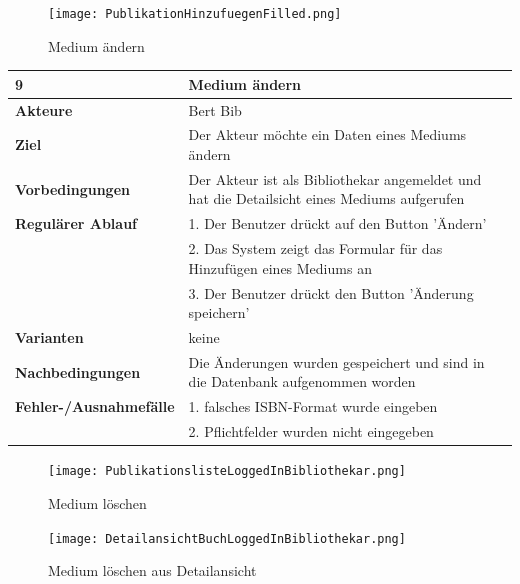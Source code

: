 \documentclass[fontsize=12pt,paper=a4,twoside]{scrartcl}
\begin{document}
\begin{figure}
	[H] \caption{Medium ändern} 
	\texttt{[image: PublikationHinzufuegenFilled.png]} \label{pic:MedAendern} 
\end{figure}
\begin{table}
	[H] \label{9} 
	\begin{tabular}
		{|l|p{10cm}|} \hline \textbf{9} & \textbf{Medium ändern} \\
		\hline \textbf{Akteure} & Bert Bib\\
		\hline \textbf{Ziel} & Der Akteur möchte ein Daten eines Mediums ändern \\
		\hline \textbf{Vorbedingungen} & Der Akteur ist als Bibliothekar angemeldet und hat die Detailsicht eines Mediums aufgerufen \\
		\hline \textbf{Regulärer Ablauf} & 1. Der Benutzer drückt auf den Button 'Ändern' \\
		&2. Das System zeigt das Formular für das Hinzufügen eines Mediums an\\
		&3. Der Benutzer drückt den Button 'Änderung speichern'\\
		\hline \textbf{Varianten} & keine \\
		\hline \textbf{Nachbedingungen} & Die Änderungen wurden gespeichert und sind in die Datenbank aufgenommen worden\\
		\hline \textbf{Fehler-/Ausnahmefälle} & 1. falsches ISBN-Format wurde eingeben\\
		&2. Pflichtfelder wurden nicht eingegeben\\
		\hline 
	\end{tabular}
\end{table}
\begin{figure}
	[H] \caption{Medium löschen} 
	\texttt{[image: PublikationslisteLoggedInBibliothekar.png]} \label{pic:MedLoeschen} 
\end{figure}
\begin{figure}
	[H] \caption{Medium löschen aus Detailansicht} 
	\texttt{[image: DetailansichtBuchLoggedInBibliothekar.png]} \label{pic:MedLoeschenDetailansicht} 
\end{figure}
\end{document}
